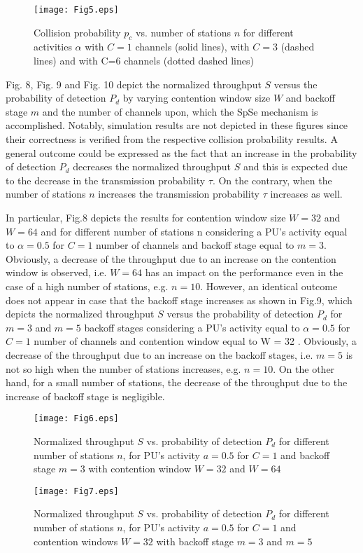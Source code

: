 \documentclass
[journal,11pt,draftclsnofoot,onecolumn,doublespace]{tETN2e}
\begin{document}
\begin{figure}
\centering
  \texttt{[image: Fig5.eps]}\\
  \caption{Collision probability $p_c$ vs. number of stations $n$ for different activities $\alpha$ with $C=1$ channels (solid lines), with $C=3$ (dashed lines) and with C=6 channels (dotted dashed lines)}
  \label{fig:5}
\end{figure}

Fig. 8, Fig. 9 and Fig. 10 depict the normalized throughput $S$ versus the probability of detection $P_d$ by varying contention window size $W$ and backoff stage $m$ and the number of channels upon, which the SpSe mechanism is accomplished. Notably, simulation results are not depicted in these figures since their correctness is verified from the respective collision probability results. A general outcome could be expressed as the fact that an increase in the probability of detection $P_d$ decreases the normalized throughput $S$ and this is expected due to the decrease in the transmission probability $\tau$. On the contrary, when the number of stations $n$ increases the transmission probability $\tau$ increases as well. 

In particular, Fig.8 depicts the results for contention window size $W=32$ and $W=64$ and for different number of stations n considering a PU’s activity equal to $\alpha=0.5$ for $C=1$ number of channels and backoff stage equal to $m=3$. Obviously, a decrease of the throughput due to an increase on the contention window is observed, i.e. $W=64$ has an impact on the performance even in the case of a high number of stations, e.g. $n=10$. However, an identical outcome does not appear in case that the backoff stage increases as shown in Fig.9, which depicts the normalized throughput $S$ versus the probability of detection $P_d$ for $m=3$ and $m=5$ backoff stages considering a PU’s activity equal to $\alpha=0.5$ for $C=1$ number of channels and contention window equal to W = 32 . Obviously, a decrease of the throughput due to an increase on the backoff stages, i.e. $m=5$ is not so high when the number of stations increases, e.g. $n=10$. On the other hand, for a small number of stations, the decrease of the throughput due to the increase of backoff stage is negligible. 
\begin{figure}
\centering
  \texttt{[image: Fig6.eps]}\\
  \caption{Normalized throughput $S$ vs. probability of detection $P_d$ for different number of stations $n$, for PU’s activity $a=0.5$ for $C=1$ and backoff stage $m=3$ with contention window $W=32$ and $W=64$}
  \label{fig:6}
\end{figure}
\begin{figure}
\centering
  \texttt{[image: Fig7.eps]}\\
  \caption{Normalized throughput $S$ vs. probability of detection $P_d$ for different number of stations $n$, for PU’s activity $a=0.5$ for $C=1$ and contention windows $W=32$ with backoff stage $m=3$ and $m=5$}
  \label{fig:7}
\end{figure}
\end{document}

